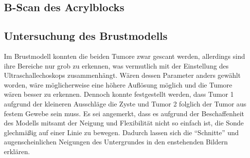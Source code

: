 \subsection{B-Scan des Acrylblocks}

\subsection{Untersuchung des Brustmodells}
Im Brustmodell konnten die beiden Tumore zwar gescant werden, allerdings sind ihre Bereiche nur grob zu erkennen,
was vermutlich mit der Einstellung des Ultraschallechoskops zusammenhängt.
Wären dessen Parameter anders gewählt worden, wäre möglicherweise eine höhere Auflösung möglich und die Tumore wären besser zu erkennen.
Dennoch konnte festgestellt werden, dass Tumor 1 aufgrund der kleineren Ausschläge die Zyste und Tumor 2 folglich der Tumor aus 
festem Gewebe sein muss.
Es sei angemerkt, dass es aufgrund der Beschaffenheit des Modells mitsamt der Neigung und Flexibilität nicht so einfach ist,
die Sonde glechmäßig auf einer Linie zu bewegen. 
Dadurch lassen sich die \enquote{Schnitte} und augenscheinlichen Neigungen des Untergrundes in den enstehenden Bildern erklären.
